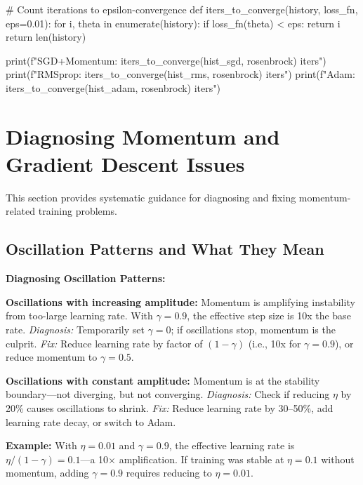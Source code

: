 \documentclass[../../main.tex]{subfiles}
\begin{document}
\begin{pythoncode}
# Count iterations to epsilon-convergence
def iters_to_converge(history, loss_fn, eps=0.01):
    for i, theta in enumerate(history):
        if loss_fn(theta) < eps:
            return i
    return len(history)

print(f"SGD+Momentum: {iters_to_converge(hist_sgd, rosenbrock)} iters")
print(f"RMSprop: {iters_to_converge(hist_rms, rosenbrock)} iters")
print(f"Adam: {iters_to_converge(hist_adam, rosenbrock)} iters")
\end{pythoncode}

\section{Diagnosing Momentum and Gradient Descent Issues}
\label{sec:ch11-diagnosing}

This section provides systematic guidance for diagnosing and fixing momentum-related training problems.

\subsection{Oscillation Patterns and What They Mean}

\begin{important}
\textbf{Diagnosing Oscillation Patterns:}

\textbf{Oscillations with increasing amplitude:} Momentum is amplifying instability from too-large learning rate. With $\gamma = 0.9$, the effective step size is 10x the base rate. \emph{Diagnosis:} Temporarily set $\gamma = 0$; if oscillations stop, momentum is the culprit. \emph{Fix:} Reduce learning rate by factor of $(1 - \gamma)$ (i.e., 10x for $\gamma = 0.9$), or reduce momentum to $\gamma = 0.5$.

\textbf{Oscillations with constant amplitude:} Momentum is at the stability boundary---not diverging, but not converging. \emph{Diagnosis:} Check if reducing $\eta$ by 20\% causes oscillations to shrink. \emph{Fix:} Reduce learning rate by 30--50\%, add learning rate decay, or switch to Adam.

\textbf{Example:} With $\eta = 0.01$ and $\gamma = 0.9$, the effective learning rate is $\eta/(1-\gamma) = 0.1$---a 10$\times$ amplification. If training was stable at $\eta = 0.1$ without momentum, adding $\gamma = 0.9$ requires reducing to $\eta = 0.01$.
\end{important}
\end{document}
